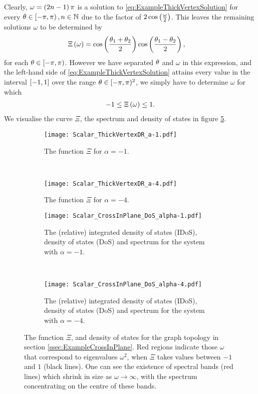 Clearly, $\omega=\left( 2n-1 \right)\pi$ is a solution to \eqref{eq:ExampleThickVertexSolution} for every $\theta\in\left[-\pi,\pi\right), n\in\mathbb{N}$ due to the factor of $2\cos\left( \frac{\omega}{2} \right)$.
This leaves the remaining solutions $\omega$ to be determined by
\begin{align*}
	\Xi\left( \omega \right) &= \cos\left( \frac{\theta_1+\theta_2}{2} \right)\cos\left( \frac{\theta_1-\theta_2}{2} \right),
\end{align*}
for each $\theta\in\left[-\pi,\pi\right)$.
However we have separated $\theta$ and $\omega$ in this expression, and the left-hand side of \eqref{eq:ExampleThickVertexSolution} attains every value in the interval $\left[ -1,1 \right]$ over the range $\theta\in[-\pi,\pi)^2$, we simply have to determine $\omega$ for which
\begin{align} \label{eq:ExampleThickVertexDispExpr}
	-1 \leq \Xi\left( \omega \right) \leq 1.
\end{align}
We visualise the curve $\Xi$, the spectrum and density of states in figure \ref{fig:Scalar_ThickVertexAllResults}.
\begin{figure}[t!]
	\centering
	\begin{subfigure}[t]{0.45\textwidth}
		\centering
		\texttt{[image: Scalar\_ThickVertexDR\_a-1.pdf]}
		\caption{\label{fig:Scalar_ThickVertexDR_a-1} The function $\Xi$ for $\alpha=-1$.}
	\end{subfigure}
	~
	\begin{subfigure}[t]{0.45\textwidth}
		\centering
		\texttt{[image: Scalar\_ThickVertexDR\_a-4.pdf]}
		\caption{\label{fig:Scalar_ThickVertexDR_a-4} The function $\Xi$ for $\alpha=-4$.}
	\end{subfigure}
	\newline
	\begin{subfigure}[t]{0.45\textwidth}
		\centering
		\texttt{[image: Scalar\_CrossInPlane\_DoS\_alpha-1.pdf]}
		\caption{\label{fig:Scalar_CrossInPlane_DoS_alpha-1} The (relative) integrated density of states (IDoS), density of states (DoS) and spectrum for the system with $\alpha=-1$.}
	\end{subfigure}
	~
	\begin{subfigure}[t]{0.45\textwidth}
		\centering
		\texttt{[image: Scalar\_CrossInPlane\_DoS\_alpha-4.pdf]}
		\caption{\label{fig:Scalar_CrossInPlane_DoS_alpha-4} The (relative) integrated density of states (IDoS), density of states (DoS) and spectrum for the system with $\alpha=-4$.}
	\end{subfigure}	
	\caption{\label{fig:Scalar_ThickVertexAllResults} The function $\Xi$, and density of states for the graph topology in section \ref{ssec:ExampleCrossInPlane}.
	Red regions indicate those $\omega$ that correspond to eigenvalues $\omega^2$, when $\Xi$ takes values between $-1$ and $1$ (black lines).
	One can see the existence of spectral bands (red lines) which shrink in size as $\omega\rightarrow\infty$, with the spectrum concentrating on the centre of these bands.}
\end{figure}
